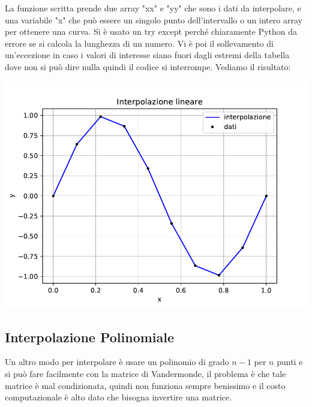 \documentclass[10pt,a4paper]{article}
\begin{document}
La funzione scritta prende due array "xx" e "yy" che sono i dati da interpolare, e una variabile "x" che può essere un singolo punto dell'intervallo o un intero array per ottenere una curva. Si è usato un try except perché chiaramente Python da errore se si calcola la lunghezza di un numero. Vi è poi il sollevamento di un'eccezione in caso i valori di interesse siano fuori dagli estremi della tabella dove non si può dire nulla quindi il codice si interrompe. Vediamo il risultato:

\begin{center}
\includegraphics[scale=0.8]{img/int_lin.pdf}    
\end{center}

\subsection{Interpolazione Polinomiale}
Un altro modo per interpolare è usare un polinomio di grado $n-1$ per $n$ punti e si può fare facilmente con la matrice di Vandermonde, il problema è che tale matrice è mal condizionata, quindi non funziona sempre benissimo e il costo computazionale è alto dato che bisogna invertire una matrice.
\end{document}
